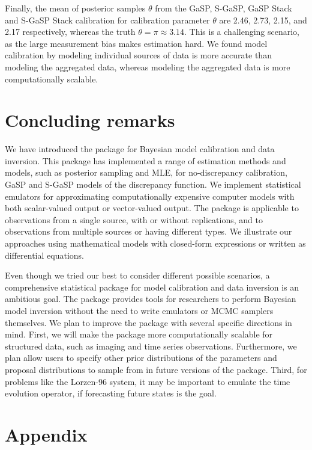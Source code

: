 Finally,  the mean of posterior samples $\theta$ from the GaSP, S-GaSP, GaSP Stack and S-GaSP Stack calibration for calibration parameter $\theta$ are 2.46, 2.73, 2.15, and 2.17 respectively, whereas the truth $\theta=\pi\approx 3.14$. This is a challenging scenario, as the large measurement bias makes estimation hard. We found model calibration by modeling individual sources of data is more accurate than modeling the aggregated data, whereas modeling the aggregated data is more computationally scalable.  

 

\section{Concluding remarks}
We have introduced the   package for Bayesian model calibration and data inversion. This package has implemented a range of  estimation methods and models, such as posterior sampling and MLE, for no-discrepancy calibration, GaSP and S-GaSP models of the discrepancy function. We implement statistical emulators for approximating computationally expensive computer models with both scalar-valued output or vector-valued output. The package is applicable to observations from a single source, with or without replications, and to observations from multiple sources or having different types. We illustrate our approaches using mathematical models with closed-form expressions or written as differential equations. 

Even though we tried our best to consider different possible scenarios,  a comprehensive statistical package for model calibration and data inversion is an ambitious goal. The  package provides tools for researchers to perform Bayesian model inversion without the need to write emulators or MCMC samplers themselves. We plan to improve the  package with several specific directions in mind. First, we will make the package more computationally scalable for structured data, such as imaging and time series observations. 
Furthermore,  we plan allow users to specify other prior distributions of the parameters and proposal distributions to sample from in future versions of the package. Third, for problems like the Lorzen-96 system, it may be important to emulate the time evolution operator, if forecasting future states is the goal. 



\section{Appendix}

